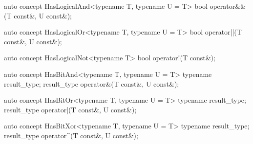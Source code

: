\documentclass[american,twoside]{book}
\begin{document}
\begin{itemdecl}
auto concept HasLogicalAnd<typename T, typename U = T> {
  bool operator&&(T const&, U const&);
}
\end{itemdecl}

\begin{itemdescr}
\pnum
{}
\end{itemdescr}

\begin{itemdecl}
auto concept HasLogicalOr<typename T, typename U = T> {
  bool operator||(T const&, U const&);
}
\end{itemdecl}

\begin{itemdescr}
\pnum
{}
\end{itemdescr}

\begin{itemdecl}
auto concept HasLogicalNot<typename T> {
  bool operator!(T const&);
}
\end{itemdecl}

\begin{itemdescr}
\pnum
{}
\end{itemdescr}

\begin{itemdecl}
auto concept HasBitAnd<typename T, typename U = T> {
  typename result_type;
  result_type operator&(T const&, U const&);
}
\end{itemdecl}

\begin{itemdescr}
\pnum
{}
\end{itemdescr}

\begin{itemdecl}
auto concept HasBitOr<typename T, typename U = T> {
  typename result_type;
  result_type operator|(T const&, U const&);
}
\end{itemdecl}

\begin{itemdescr}
\pnum
{}
\end{itemdescr}

\begin{itemdecl}
auto concept HasBitXor<typename T, typename U = T> {
  typename result_type;
  result_type operator^(T const&, U const&);
}
\end{itemdecl}
\end{document}
